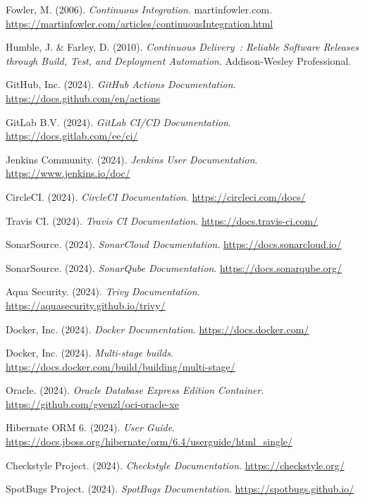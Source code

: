 \documentclass[12pt,a4paper]{report}
\begin{document}
\begin{enumerate}[leftmargin=*, label={[\arabic*]}]
  \item Fowler, M. (2006). \textit{Continuous Integration}. martinfowler.com.
        \url{https://martinfowler.com/articles/continuousIntegration.html}
  \item Humble, J. \& Farley, D. (2010). \textit{Continuous Delivery~: Reliable
        Software Releases through Build, Test, and Deployment Automation}.
        Addison-Wesley Professional.
  \item GitHub, Inc. (2024). \textit{GitHub Actions Documentation}.
        \url{https://docs.github.com/en/actions}
  \item GitLab B.V. (2024). \textit{GitLab CI/CD Documentation}.
        \url{https://docs.gitlab.com/ee/ci/}
  \item Jenkins Community. (2024). \textit{Jenkins User Documentation}.
        \url{https://www.jenkins.io/doc/}
  \item CircleCI. (2024). \textit{CircleCI Documentation}.
        \url{https://circleci.com/docs/}
  \item Travis CI. (2024). \textit{Travis CI Documentation}.
        \url{https://docs.travis-ci.com/}
  \item SonarSource. (2024). \textit{SonarCloud Documentation}.
        \url{https://docs.sonarcloud.io/}
  \item SonarSource. (2024). \textit{SonarQube Documentation}.
        \url{https://docs.sonarqube.org/}
  \item Aqua Security. (2024). \textit{Trivy Documentation}.
        \url{https://aquasecurity.github.io/trivy/}
  \item Docker, Inc. (2024). \textit{Docker Documentation}.
        \url{https://docs.docker.com/}
  \item Docker, Inc. (2024). \textit{Multi-stage builds}.
        \url{https://docs.docker.com/build/building/multi-stage/}
  \item Oracle. (2024). \textit{Oracle Database Express Edition Container}.
        \url{https://github.com/gvenzl/oci-oracle-xe}
  \item Hibernate ORM 6. (2024). \textit{User Guide}.
        \url{https://docs.jboss.org/hibernate/orm/6.4/userguide/html_single/}
  \item Checkstyle Project. (2024). \textit{Checkstyle Documentation}.
        \url{https://checkstyle.org/}
  \item SpotBugs Project. (2024). \textit{SpotBugs Documentation}.
        \url{https://spotbugs.github.io/}
\end{enumerate}
\end{document}
